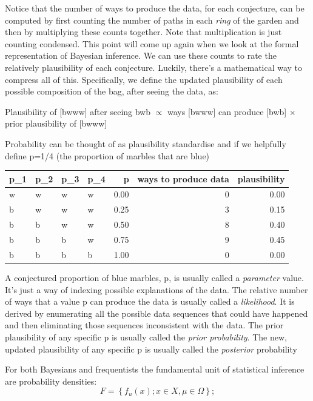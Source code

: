 \documentclass{article}
\begin{document}
Notice that the number of ways to produce the data, for each conjecture,
can be computed by first counting the number of paths in each
\emph{ring} of the garden and then by multiplying these counts together.
Note that multiplication is just counting condensed. This point will
come up again when we look at the formal representation of Bayesian
inference. We can use these counts to rate the relatively plausibility
of each conjecture. Luckily, there's a mathematical way to compress all
of this. Specifically, we define the updated plausibility of each
possible composition of the bag, after seeing the data, as:

Plausibility of {[}bwww{]} after seeing bwb \(\propto\) ways {[}bwww{]}
can produce {[}bwb{]} \(\times\) prior plausibility of {[}bwww{]}

Probability can be thought of as plausibility standardise and if we
helpfully define p=1/4 (the proportion of marbles that are blue)

\begin{table}[H]
\centering
\begin{tabular}{l|l|l|l|r|r|r}
\hline
p\_1 & p\_2 & p\_3 & p\_4 & p & ways to produce data & plausibility\\
\hline
w & w & w & w & 0.00 & 0 & 0.00\\
\hline
b & w & w & w & 0.25 & 3 & 0.15\\
\hline
b & b & w & w & 0.50 & 8 & 0.40\\
\hline
b & b & b & w & 0.75 & 9 & 0.45\\
\hline
b & b & b & b & 1.00 & 0 & 0.00\\
\hline
\end{tabular}
\end{table}

A conjectured proportion of blue marbles, p, is usually called a
\emph{parameter} value. It's just a way of indexing possible
explanations of the data. The relative number of ways that a value p can
produce the data is usually called a \emph{likelihood}. It is derived by
enumerating all the possible data sequences that could have happened and
then eliminating those sequences inconsistent with the data. The prior
plausibility of any specific p is usually called the \emph{prior
probability}. The new, updated plausibility of any specific p is usually
called the \emph{posterior} probability

For both Bayesians and frequentists the fundamental unit of statistical
inference are probability densities:
\[F=\left\{f_u(x);x \in X,\mu \in \Omega \right\};\]
\end{document}

